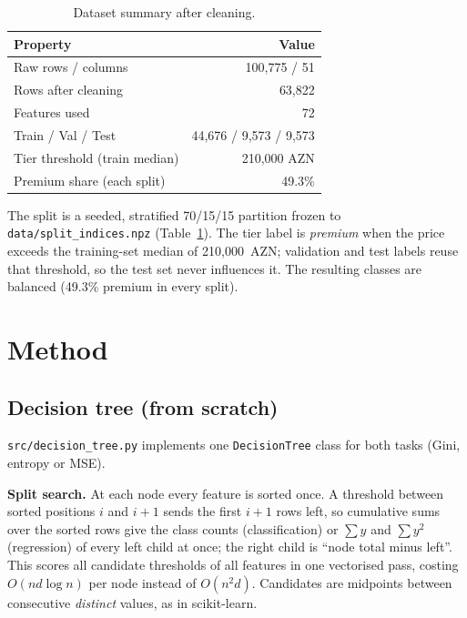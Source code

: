 \documentclass[10pt,twocolumn,a4paper]{article}
\newcommand{\code}[1]{\texttt{#1}}
\begin{document}
\begin{table}[t]
  \centering
  \caption{Dataset summary after cleaning.}
  \label{tab:data}
  \begin{tabular}{@{}lr@{}}
    \toprule
    Property & Value \\
    \midrule
    Raw rows / columns            & 100,775 / 51 \\
    Rows after cleaning           & 63,822 \\
    Features used                 & 72 \\
    Train / Val / Test            & 44,676 / 9,573 / 9,573 \\
    Tier threshold (train median) & 210,000 AZN \\
    Premium share (each split)    & 49.3\% \\
    \bottomrule
  \end{tabular}
\end{table}

The split is a seeded, stratified 70/15/15 partition frozen to
\code{data/split\_indices.npz} (Table~\ref{tab:data}). The tier label is
\emph{premium} when the price exceeds the training-set median of
210,000~AZN; validation and test labels reuse that threshold, so the test
set never influences it. The resulting classes are balanced (49.3\%
premium in every split).

\section{Method}
\subsection{Decision tree (from scratch)}
\code{src/decision\_tree.py} implements one \code{DecisionTree} class for
both tasks (Gini, entropy or MSE).

\textbf{Split search.} At each node every feature is sorted once.
A threshold between sorted positions $i$ and $i+1$ sends the first $i+1$
rows left, so cumulative sums over the sorted rows give the class counts
(classification) or $\sum y$ and $\sum y^2$ (regression) of every left
child at once; the right child is ``node total minus left''. This scores
all candidate thresholds of all features in one vectorised pass, costing
$O(nd\log n)$ per node instead of $O(n^2 d)$. Candidates are midpoints
between consecutive \emph{distinct} values, as in scikit-learn.
\end{document}

